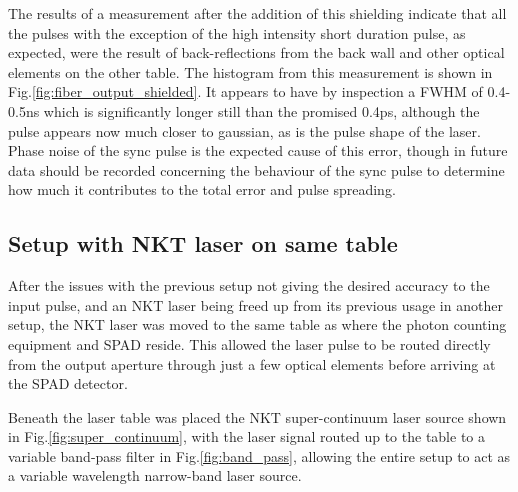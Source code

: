 \documentclass[a4paper]{article}
\begin{document}
The results of a measurement after the addition of this shielding indicate that all the pulses with the exception of the high intensity short duration pulse, as expected, were the result of back-reflections from the back wall and other optical elements on the other table. The histogram from this measurement is shown in Fig.\ref{fig:fiber_output_shielded}. It appears to have by inspection a FWHM of 0.4-0.5ns which is significantly longer still than the promised 0.4ps, although the pulse appears now much closer to gaussian, as is the pulse shape of the laser. Phase noise of the sync pulse is the expected cause of this error, though in future data should be recorded concerning the behaviour of the sync pulse to determine how much it contributes to the total error and pulse spreading.

\subsection{Setup with NKT laser on same table}

After the issues with the previous setup not giving the desired accuracy to the input pulse, and an NKT laser being freed up from its previous usage in another setup, the NKT laser was moved to the same table as where the photon counting equipment and SPAD reside. This allowed the laser pulse to be routed directly from the output aperture through just a few optical elements before arriving at the SPAD detector.

Beneath the laser table was placed the NKT super-continuum laser source shown in Fig.\ref{fig:super_continuum}, with the laser signal routed up to the table to a variable band-pass filter in Fig.\ref{fig:band_pass}, allowing the entire setup to act as a variable wavelength narrow-band laser source.
\end{document}
